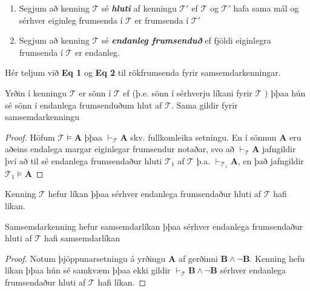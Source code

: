 \documentclass[12pt]{book}
\newcommand{\emphs}[1]{\textbf{\emph{#1}}}
\begin{document}
\begin{skgr}
  \begin{enumerate}[(1)]
  \item  Segjum að kenning $\mathcal{T}$ sé \emphs{hluti}
    af kenningu $\mathcal{T}'$ ef $\mathcal{T}$ og $\mathcal{T}'$ hafa
    sama mál og sérhver eiginleg frumsenda í $\mathcal{T}$ er frumsenda 
    í $\mathcal{T}'$
  \item Segjum að kenning $\mathcal{T}$ sé \emphs{endanleg frumsenduð}
    ef fjöldi eiginlegra frumsenda í $\mathcal{T}$ er endanleg.
  \end{enumerate}
\end{skgr}

\begin{ath}
 Hér teljum við \textbf{Eq 1} og \textbf{Eq 2} til rökfrumsenda fyrir
 samsemdarkenningar.
\end{ath}

\begin{setn}[Þjöppunarsetning]
  Yrðin í kenningu $\mathcal{T}$ er sönn í $\mathcal{T}$ ef (þ.e. sönn
  í sérhverju líkani fyrir $\mathcal{T}$ ) þþaa
  hún sé sönn í endanlega frumsenduðum hlut af $\mathcal{T}$.
  Sama gildir fyrir samsemdarkenningu
\end{setn}

\begin{proof}
  Höfum $\mathcal{T} \models \mathbf{A}$ þþaa $\vdash_{\mathcal{T}} \mathbf{A}$
  skv. fullkomleika setningu. En í sönnun $\mathbf{A}$ eru aðeins endalega
  margar eiginlegar frumsendur notaðar, svo að $\vdash_{\mathcal{T}} \mathbf{A}$
  jafngildir því að til sé endanlega frumsendaður hluti $\mathcal{T}_{1}$
  af $\mathcal{T}$ þ.a. $\vdash_{\mathcal{T}_1} \mathbf{A}$, en það jafngildir
  $\mathcal{T}_1 \models \mathbf{A}$
\end{proof}
\begin{setn}[Fylgisetn]
  Kenning $\mathcal{T}$ hefur líkan þþaa sérhver endanlega
  frumsendaður hluti af $\mathcal{T}$ hafi líkan.
  
  Samsemdarkenning hefur samsemdarlíkan þþaa sérhver endanlega frumsendaður
  hluti af $\mathcal{T}$ hafi samsemdarlíkan
\end{setn}

\begin{proof}
  Notum þjöppunarsetningu á yrðingu $\mathbf{A}$ af gerðinni
  $\mathbf{B} \wedge \lnot \mathbf{B}$. Kenning hefu líkan þþaa
  hún sé samkvæm þþaa ekki gildir $\vdash_{\mathcal{T}} \mathbf{B} \wedge \lnot \mathbf{B}$
  sérhver endanlega frumsendaður hluti af $\mathcal{T}$ hafi líkan.
\end{proof}
\end{document}
